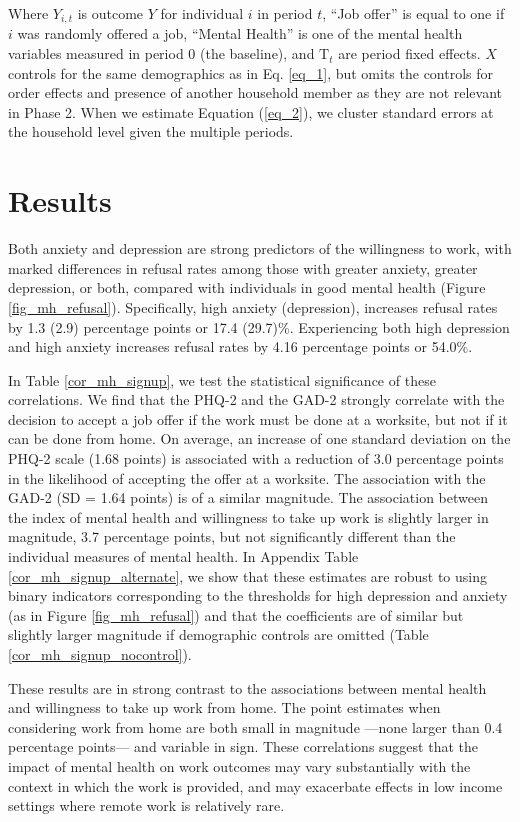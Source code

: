 \documentclass[12pt, a4paper, american]{article}
\begin{document}
Where $Y_{i,t}$ is outcome $Y$ for individual $i$ in period $t$, ``Job offer'' is equal to one if $i$ was randomly offered a job, ``Mental Health'' is one of the mental health variables measured in period 0 (the baseline), and $\text{T}_t$ are period fixed effects. $X$ controls for the same demographics as in Eq. \ref{eq_1}, but omits the controls for order effects and presence of another household member as they are not relevant in Phase 2. When we estimate Equation (\ref{eq_2}), we cluster standard errors at the household level given the multiple periods.



\section{Results}\label{sec_results}

Both anxiety and depression are strong predictors of the willingness to work, with marked differences in refusal rates among those with greater anxiety, greater depression, or both, compared with individuals in good mental health (Figure \ref{fig_mh_refusal}). Specifically, high anxiety (depression), increases refusal rates by 1.3 (2.9) percentage points or 17.4 (29.7)\%. Experiencing both high depression and high anxiety increases refusal rates by 4.16 percentage points or 54.0\%. 

In Table \ref{cor_mh_signup}, we test the statistical significance of these correlations. We find that the PHQ-2 and the GAD-2 strongly correlate with the decision to accept a job offer if the work must be done at a worksite, but not if it can be done from home. On average, an increase of one standard deviation on the PHQ-2 scale (1.68 points) is associated with a reduction of 3.0 percentage points in the likelihood of accepting the offer at a worksite. The association with the GAD-2 (SD = 1.64 points) is of a similar magnitude. The association between the index of mental health and willingness to take up work is slightly larger in magnitude, 3.7 percentage points, but not significantly different than the individual measures of mental health. In Appendix Table \ref{cor_mh_signup_alternate}, we show that these estimates are robust to using binary indicators corresponding to the thresholds for high depression and anxiety (as in Figure \ref{fig_mh_refusal}) and that the coefficients are of similar but slightly larger magnitude if demographic controls are omitted (Table \ref{cor_mh_signup_nocontrol}). 

These results are in strong contrast to the associations between mental health and willingness to take up work from home. The point estimates when considering work from home are both small in magnitude ---none larger than 0.4 percentage points--- and variable in sign. These correlations suggest that the impact of mental health on work outcomes may vary substantially with the context in which the work is provided, and may exacerbate effects in low income settings where remote work is relatively rare.  
\end{document}
